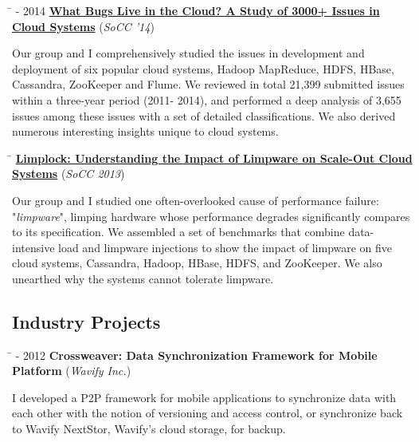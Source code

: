 \documentclass[10pt]{article} %
\begin{document}
\begin{tabbing}
\hspace{2.5cm} \=  - 2014 \>\+ \href{http://ucare.cs.uchicago.edu/pdf/socc14-cbs.pdf}{\textbf{What Bugs Live in the Cloud? A Study of 3000+ Issues in Cloud Systems}} (\textit{SoCC '14}) \\
\begin{minipage}{\smallertextwidth}
Our group and I comprehensively studied the issues in development and deployment of six
popular cloud systems, Hadoop MapReduce, HDFS, HBase, Cassandra, ZooKeeper and
Flume. We reviewed in total 21,399 submitted issues within a three-year period
(2011- 2014), and performed a deep analysis of 3,655  issues among these
issues with a set of detailed classifications. We also derived numerous
interesting insights unique to cloud systems. 
\end{minipage}
\end{tabbing}

\begin{tabbing}
\hspace{2.5cm} \=  \>\+ \href{http://ucare.cs.uchicago.edu/pdf/socc13-limplock.pdf}{\textbf{Limplock: Understanding the Impact of Limpware on Scale-Out Cloud Systems}} (\textit{SoCC 2013}) \\
\begin{minipage}{\smallertextwidth}
Our group and I studied one often-overlooked cause of performance failure:
"\textit{limpware}", limping hardware whose performance degrades significantly
compares to its specification. We assembled a set of benchmarks that combine
data-intensive load and limpware injections to show the impact of limpware on
five cloud systems, Cassandra, Hadoop, HBase, HDFS, and ZooKeeper. We
also unearthed why the systems cannot tolerate limpware.
\end{minipage}
\end{tabbing}

\subsection{Industry Projects}

\begin{tabbing}
\hspace{2.5cm} \=  - 2012 \>\+ \textbf{Crossweaver: Data Synchronization Framework for Mobile Platform} (\textit{Wavify Inc.}) \\
\begin{minipage}{\smallertextwidth}
I developed a P2P framework for mobile applications to synchronize data with
each other with the notion of versioning and access control, or synchronize
back to Wavify NextStor, Wavify's cloud storage, for backup.
\end{minipage}
\end{tabbing}
\end{document}
